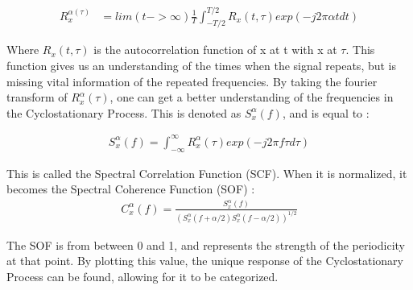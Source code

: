 \begin{align}\label{eq:caf}
    R_x^{\alpha(\tau)} &= lim(t->\infty) \frac{1}{T} \int_{-T/2}^{T/2} R_x(t,\tau)exp(-j2\pi\alpha t dt)
\end{align}

Where $R_x(t,\tau)$ is the autocorrelation function of x at t with x at $\tau$. This function gives us an understanding of the times when the signal repeats, but is missing vital information of the repeated frequencies. By taking the fourier transform of $R_x^\alpha(\tau)$, one can get a better understanding of the frequencies in the Cyclostationary Process. This is denoted as $S_x^\alpha(f)$, and is equal to \cite{cyclostat_text}:  \par

\begin{align}\label{eq:scf}
S_x^\alpha(f)=\int_{-\infty}^{\infty} R_x^\alpha(\tau)exp(-j2\pi f\tau d\tau) 
\end{align}
\par

This is called the Spectral Correlation Function (SCF). When it is normalized, it becomes the Spectral Coherence Function (SOF) \cite{cyclostat_text}:
\begin{align}\label{eq:caf}
C_x^\alpha(f) = \frac{ S_x^\alpha(f)}{ (S_x^\alpha(f+\alpha/2) S_x^\alpha(f-\alpha/2))^{1/2}}
\end{align}\par
The SOF is from between 0 and 1, and represents the strength of the periodicity at that point. By plotting this value, the unique response of the Cyclostationary Process can be found, allowing for it to be categorized.\par


